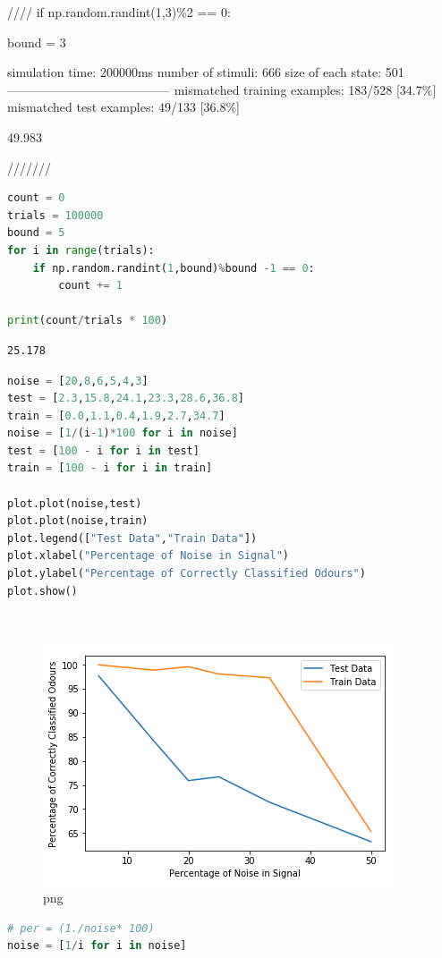 //// if np.random.randint(1,3)\%2 == 0:

bound = 3

simulation time: 200000ms number of stimuli: 666 size of each state: 501
--------------------------------------- mismatched training examples:
183/528 {[}34.7\%{]} mismatched test examples: 49/133 {[}36.8\%{]}

49.983

///////

\begin{lstlisting}[language=Python]
count = 0
trials = 100000
bound = 5
for i in range(trials):
    if np.random.randint(1,bound)%bound -1 == 0:
        count += 1
        
print(count/trials * 100)
\end{lstlisting}

\begin{lstlisting}
25.178
\end{lstlisting}

\begin{lstlisting}[language=Python]
noise = [20,8,6,5,4,3]
test = [2.3,15.8,24.1,23.3,28.6,36.8]
train = [0.0,1.1,0.4,1.9,2.7,34.7]
noise = [1/(i-1)*100 for i in noise]
test = [100 - i for i in test]
train = [100 - i for i in train]

plot.plot(noise,test)
plot.plot(noise,train)
plot.legend(["Test Data","Train Data"])
plot.xlabel("Percentage of Noise in Signal")
plot.ylabel("Percentage of Correctly Classified Odours")
plot.show()




\end{lstlisting}

\begin{figure}
\centering
\includegraphics{olfactory_files/olfactory_16_0.png}
\caption{png}
\end{figure}

\begin{lstlisting}[language=Python]
# per = (1./noise* 100)
noise = [1/i for i in noise]
\end{lstlisting}

\begin{lstlisting}[language=Python]
\end{lstlisting}


